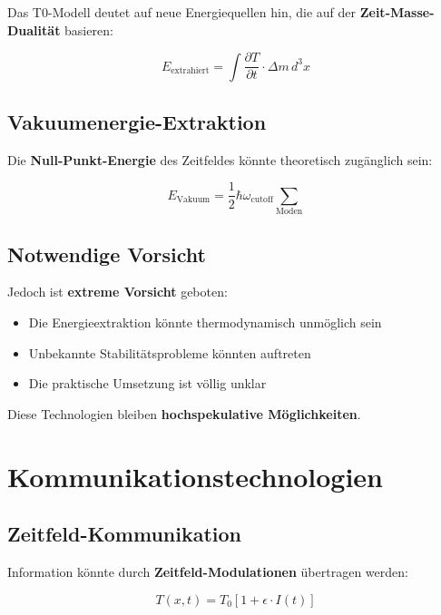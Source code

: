 \documentclass[12pt,a4paper]{report}
\begin{document}
	Das T0-Modell deutet auf neue Energiequellen hin, die auf der \textbf{Zeit-Masse-Dualität} basieren:
	
	\begin{equation}
		E_{\text{extrahiert}} = \int \frac{\partial T}{\partial t} \cdot \Delta m \, d^3x
	\end{equation}
	
	\subsection{Vakuumenergie-Extraktion}
	
	Die \textbf{Null-Punkt-Energie} des Zeitfeldes könnte theoretisch zugänglich sein:
	
	\begin{equation}
		E_{\text{Vakuum}} = \frac{1}{2}\hbar\omega_{\text{cutoff}} \sum_{\text{Moden}}
	\end{equation}
	
	\subsection{Notwendige Vorsicht}
	
	Jedoch ist \textbf{extreme Vorsicht} geboten:
	
	\begin{itemize}
		\item Die Energieextraktion könnte thermodynamisch unmöglich sein
		\item Unbekannte Stabilitätsprobleme könnten auftreten
		\item Die praktische Umsetzung ist völlig unklar
	\end{itemize}
	
	Diese Technologien bleiben \textbf{hochspekulative Möglichkeiten}.
	
	\section{Kommunikationstechnologien}
	
	\subsection{Zeitfeld-Kommunikation}
	
	Information könnte durch \textbf{Zeitfeld-Modulationen} übertragen werden:
	
	\begin{equation}
		T(x,t) = T_0[1 + \epsilon \cdot I(t)]
	\end{equation}
	
\end{document}
